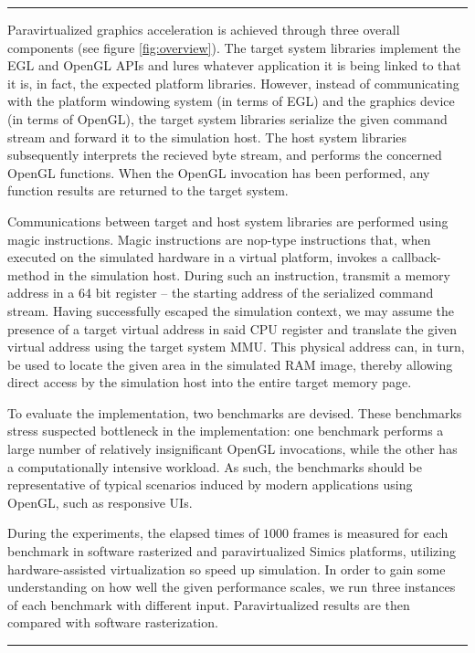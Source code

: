 \documentclass{article}
\begin{document}
\noindent\rule{8cm}{0.4pt}

Paravirtualized graphics acceleration is achieved through three overall components (see figure \ref{fig:overview}).
The target system libraries implement the EGL and OpenGL APIs and lures whatever application it is being linked to that it is, in fact, the expected platform libraries.
However, instead of communicating with the platform windowing system (in terms of EGL) and the graphics device (in terms of OpenGL), the target system libraries serialize the given command stream and forward it to the simulation host.
The host system libraries subsequently interprets the recieved byte stream, and performs the concerned OpenGL functions.
When the OpenGL invocation has been performed, any function results are returned to the target system.

Communications between target and host system libraries are performed using magic instructions.
Magic instructions are nop-type instructions that, when executed on the simulated hardware in a virtual platform, invokes a callback-method in the simulation host.
During such an instruction, transmit a memory address in a 64 bit register -- the starting address of the serialized command stream.
Having successfully escaped the simulation context, we may assume the presence of a target virtual address in said CPU register and translate the given virtual address using the target system MMU.
This physical address can, in turn, be used to locate the given area in the simulated RAM image, thereby allowing direct access by the simulation host into the entire target memory page.

To evaluate the implementation, two benchmarks are devised.
These benchmarks stress suspected bottleneck in the implementation: one benchmark performs a large number of relatively insignificant OpenGL invocations, while the other has a computationally intensive workload.
As such, the benchmarks should be representative of typical scenarios induced by modern applications using OpenGL, such as responsive UIs.

During the experiments, the elapsed times of $1000$ frames is measured for each benchmark in software rasterized and paravirtualized Simics platforms, utilizing hardware-assisted virtualization so speed up simulation.
In order to gain some understanding on how well the given performance scales, we run three instances of each benchmark with different input.
Paravirtualized results are then compared with software rasterization.

\noindent\rule{8cm}{0.4pt}
\end{document}
